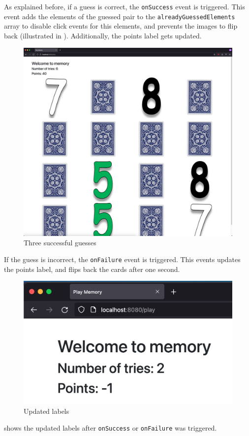 As explained before, if a guess is correct, the \texttt{onSuccess} event is triggered. This event adds the elements of the guessed pair to the \texttt{alreadyGuessedElements} array to disable click events for this elements, and prevents the images to flip back (illustrated in ). Additionally, the points label gets updated.
\begin{figure}[h]
\centering
\includegraphics[scale=0.1]{images/03_impl/frontend/flipped-cards}
\caption{Three successful guesses}
\label{fig:03_impl_frontend_memGame_flippedCards}
\end{figure}
If the guess is incorrect, the \texttt{onFailure} event is triggered. This events updates the points label, and flips back the cards after one second.
\begin{figure}[h]
\centering
\includegraphics[scale=0.3]{images/03_impl/frontend/updated-labels}
\caption{Updated labels}
\label{fig:03_impl_frontend_memGame_updateLabels}
\end{figure}
 shows the updated labels after \texttt{onSuccess} or \texttt{onFailure} was triggered.


